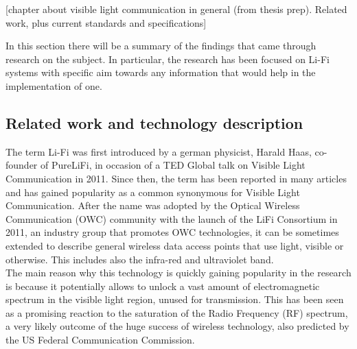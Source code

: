[chapter about visible light communication in general (from thesis prep).
Related work, plus current standards and specifications]


In this section there will be a summary of the findings that came through research on the subject.
In particular, the research has been focused on Li-Fi systems with specific aim towards any information that would help in the implementation of one.

\subsection{Related work and technology description}

The term Li-Fi was first introduced by a german physicist, Harald Haas, co-founder of PureLiFi, in occasion of a TED Global talk on Visible Light Communication in 2011. \cite{tedtalk}
Since then, the term has been reported in many articles and has gained popularity as a common synonymous for Visible Light Communication.
After the name was adopted by the Optical Wireless Communication (OWC) community with the launch of the LiFi Consortium in 2011, an industry group that promotes OWC technologies, it can be sometimes extended to describe general wireless data access points that use light, visible or otherwise.
This includes also the infra-red and ultraviolet band.\\

The main reason why this technology is quickly gaining popularity in the research is because it potentially allows to unlock a vast amount of electromagnetic spectrum in the visible light region, unused for transmission.\cite{haas1}
This has been seen as a promising reaction to the saturation of the Radio Frequency (RF) spectrum, a very likely outcome of the huge success of wireless technology, also predicted by the US Federal Communication Commission\cite{crisis}. 

